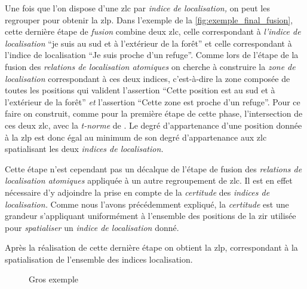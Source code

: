 Une fois que l'on dispose d'une \ac{zlc} par \emph{indice de
  localisation,} on peut les regrouper pour obtenir la \ac{zlp}. Dans
l'exemple de la \autoref{fig:exemple_final_fusion}, cette dernière
étape de \emph{fusion} combine deux \ac{zlc}, celle correspondant à
\emph{l'indice de localisation} \enquote{je suis au sud et à
  l'extérieur de la forêt} et celle correspondant à l'indice de
localisation \enquote{Je suis proche d'un refuge}. Comme lors de
l'étape de la fusion des \emph{relations de localisation atomiques} on
cherche à construire la \emph{zone de localisation} correspondant à
ces deux indices, c'est-à-dire la zone composée de toutes les
positions qui valident l'assertion \enquote{Cette position est au sud
  et à l'extérieur de la forêt} \emph{et} l'assertion \enquote{Cette
  zone est proche d'un refuge}. Pour ce faire on construit, comme pour
la première étape de cette phase, l'intersection de ces deux \ac{zlc},
avec la \emph{t-norme} de \textcite{Zadeh1965}. Le degré
d’appartenance d'une position donnée à la \ac{zlp} est donc égal au
minimum de son degré d'appartenance aux \ac{zlc} spatialisant les deux
\emph{indices de localisation.}

Cette étape n'est cependant pas un décalque de l'étape de fusion des
\emph{relations de localisation atomiques} appliquée à un autre
regroupement de \ac{zlc}. Il est en effet nécessaire d'y adjoindre la
prise en compte de la \emph{certitude} des \emph{indices de
  localisation.} Comme nous l'avons précédemment expliqué, la
\emph{certitude} est une grandeur s'appliquant uniformément à
l'ensemble des positions de la \ac{zir} utilisée pour
\emph{spatialiser} un \emph{indice de localisation} donné.

Après la réalisation de cette dernière étape on obtient la \ac{zlp},
correspondant à la spatialisation de l'ensemble des indices
localisation.


\begin{landscape}
  \begin{figure}[H] \centering
    
    \caption{Gros exemple}
    \label{fig:exemple_final_fusion}
  \end{figure}
\end{landscape}


